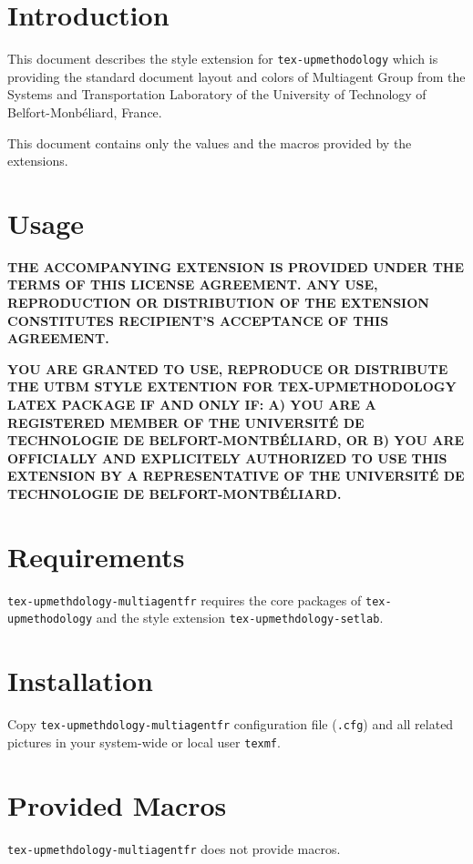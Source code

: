 \documentclass[article]{upmethodology-document}
\begin{document}
\section{Introduction}

This document describes the style extension for \texttt{tex-upmethodology} which is providing the standard document layout and colors of Multiagent Group from the Systems and Transportation Laboratory of the University of Technology of Belfort-Monb\'eliard, France.

This document contains only the values and the macros provided by the extensions.

\section{Usage}

\textbf{THE ACCOMPANYING EXTENSION IS PROVIDED UNDER THE TERMS OF THIS LICENSE AGREEMENT. ANY USE, REPRODUCTION OR DISTRIBUTION OF THE EXTENSION CONSTITUTES RECIPIENT'S ACCEPTANCE OF THIS AGREEMENT.}

\textbf{YOU ARE GRANTED TO USE, REPRODUCE OR DISTRIBUTE THE UTBM STYLE EXTENTION FOR TEX-UPMETHODOLOGY LATEX PACKAGE IF AND ONLY IF: A) YOU ARE A REGISTERED MEMBER OF THE UNIVERSIT\'E DE TECHNOLOGIE DE BELFORT-MONTB\'ELIARD, OR B) YOU ARE OFFICIALLY AND EXPLICITELY AUTHORIZED TO USE THIS EXTENSION BY A REPRESENTATIVE OF THE UNIVERSIT\'E DE TECHNOLOGIE DE BELFORT-MONTB\'ELIARD.}

\section{Requirements}

\texttt{tex-upmethdology-multiagentfr} requires the core packages of \texttt{tex-upmethodology} and the style extension \texttt{tex-upmethdology-setlab}.

\section{Installation}

Copy \texttt{tex-upmethdology-multiagentfr} configuration file (\texttt{.cfg}) and all related pictures in your system-wide or local user \texttt{texmf}.

\section{Provided Macros}

\texttt{tex-upmethdology-multiagentfr} does not provide macros.
\end{document}

